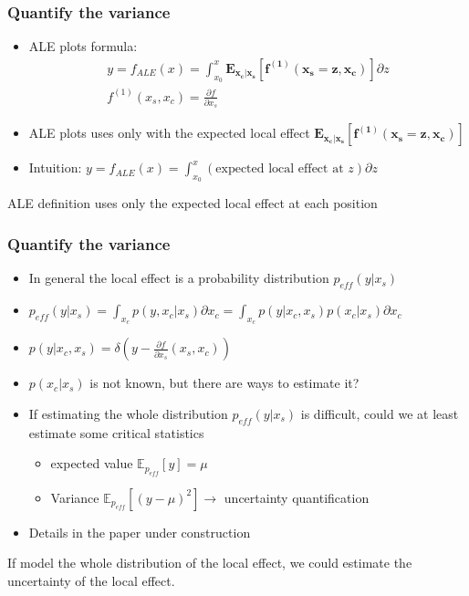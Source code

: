 \begin{frame}
  \frametitle{Quantify the variance}
  \begin{itemize}
  \item ALE plots formula:
    \begin{gather}
      y = f_{ALE}(x) = \int_{x_0}^{x} \mathbf{E_{x_c|x_s}[f^{(1)}(x_s=z,x_c)]} \partial z\\
      f^{(1)}(x_s,x_c) =  \frac{\partial f}{\partial x_s}
    \end{gather}
  \item ALE plots uses only with the expected local effect $\mathbf{E_{x_c|x_s}[f^{(1)}(x_s=z,x_c)]}$
  \item Intuition: \( y = f_{ALE}(x) = \int_{x_0}^{x} (\text{expected local effect at } z) \partial z \)
  \end{itemize}
  \noindent\makebox[\linewidth]{\rule{\paperwidth}{0.4pt}}
  ALE definition uses only the \alert{expected local effect} at each position
\end{frame}

\begin{frame}
  \frametitle{Quantify the variance}
  \begin{itemize}
  \item In general the local effect is a probability distribution \(p_{eff}(y|x_s)\)
  \item \(p_{eff}(y|x_s) = \int_{x_c} p(y,x_c|x_s) \partial x_c = \int_{x_c} p(y|x_c, x_s) p(x_c|x_s) \partial x_c\)
  \item \( p(y|x_c, x_s) = \delta (y - \frac{\partial f}{\partial x_s}(x_s,x_c)) \)
  \item \( p(x_c|x_s) \) is not known, but there are ways to estimate it?
  \item If estimating the whole distribution \(p_{eff}(y|x_s)\) is difficult, could we at least estimate some critical statistics
    \begin{itemize}
    \item expected value \( \mathbb{E}_{p_{eff}}[y] = \mu \)
    \item Variance \( \mathbb{E}_{p_{eff}}[(y - \mu)^2] \rightarrow \) uncertainty quantification
    \end{itemize}
  \item Details in the paper under construction \dSmiley
  \end{itemize}
  \noindent\makebox[\linewidth]{\rule{\paperwidth}{0.4pt}}
  If model the whole distribution of the local effect, we could estimate the uncertainty of the local effect.
\end{frame}

